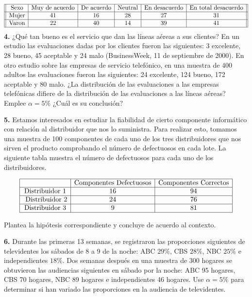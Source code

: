 \documentclass[
  a4paper,
  oneside,
  openany]{book}
\begin{document}
\[
\begin{array}{||c |c |c |c| c | c ||}
\hline 
\mbox{Sexo} & \mbox{Muy de acuerdo}& \mbox{De acuerdo} & \mbox{Neutral} & \mbox{En desacuerdo} &  \mbox{En total desacuerdo}\\
\hline 
\mbox{Mujer} & 41 &  16 & 28 & 27 & 31\\
 \hline 
\mbox{Varon} & 22 & 40 & 14 & 39 & 41 \\
\hline 
\end{array}
\]
\textbf{4.} ¿Qué tan bueno es el servicio que dan las líneas aéreas a sus clientes? En un estudio las evaluaciones dadas por los clientes fueron las siguientes: 3 excelente, 28 bueno, 45 aceptable y 24 malo (BusinessWeek, 11 de septiembre de 2000). En otro estudio sobre las empresas de servicio telefónico, en una muestra de 400 adultos las evaluaciones fueron las siguientes: 24 excelente, 124 bueno, 172 aceptable y 80 malo. ¿La distribución de las evaluaciones a las empresas telefónicas difiere de la distribución de las evaluaciones a las líneas aéreas? Emplee \(\alpha=5\%\) ¿Cuál es su conclusión?

\textbf{5.} Estamos interesados en estudiar la fiabilidad de cierto componente informático con relación al distribuidor que nos lo suministra. Para realizar esto, tomamos una muestra de 100 componentes de cada uno de los tres distribuidores que nos sirven el producto comprobando el número de defectuosos en cada lote. La siguiente tabla muestra el número de defectuosos para cada uno de los distribuidores.

\[
\begin{array}{|c | c| c|}
\hline
&\mbox{Componentes Defectuosos}& \mbox{Componentes Correctos}\\
   \hline
\mbox{Distribuidor 1}& 16& 94  \\
  \hline
\mbox{ Distribuidor 2}&24&76\\
 \hline
\mbox{Distribuidor 3}&9&81\\
    \hline
\end{array}
\]

Plantea la hipótesis correspondiente y concluye de acuerdo al contexto.

\textbf{6.} Durante las primeras 13 semanas, se registraron las proporciones siguientes de televidentes los sábados de 8 a 9 de la noche: ABC \(29\%\), CBS \(28\%\), NBC \(25\%\) e independientes \(18\%\). Dos semanas después en una muestra de 300 hogares se obtuvieron las audiencias siguientes en sábado por la noche: ABC 95 hogares, CBS 70 hogares, NBC 89 hogares e independientes 46 hogares. Use \(\alpha=5\%\) para determinar si han variado las proporciones en la audiencia de televidentes.
\end{document}
